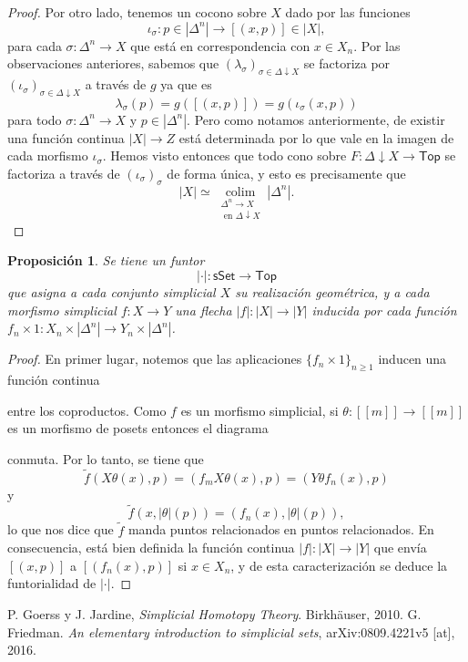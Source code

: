 \documentclass[11pt]{report}
\theoremstyle{colored}
\newtheorem{proposition}{Proposición}[section]
\newcommand{\nat}[1]{[\![#1]\!]}
\newcommand{\ord}[1]{\nat{#1}}
\newcommand{\cat}[1]{\mathsf{#1}}
\renewcommand{\ss}[1]{\Delta^{#1}}
\newcommand{\catcolim}[2]{\underset{#1}{\operatorname{colim}}#2}
\begin{document}
\begin{proof}
Por otro lado, tenemos un cocono sobre $X$ dado por las funciones
\[
\iota_\sigma : p \in |\ss{n}| \to [(x,p)] \in |X|,
\]
para cada $\sigma : \ss{n} \to X$ que está en correspondencia con $x \in X_n$. Por las observaciones anteriores, sabemos que $(\lambda_\sigma)_{\sigma \in \Delta \downarrow X}$ se factoriza por $(\iota_\sigma)_{\sigma \in \Delta \downarrow X}$ a través de $g$ ya que es
\[
\lambda_\sigma(p) = g([(x,p)]) = g(\iota_\sigma(x,p))
\]
para todo $\sigma : \ss{n} \to X$ y $p \in |\ss{n}|$. Pero como notamos anteriormente, de existir una función continua $|X| \to Z$ está determinada por lo que vale en la imagen de cada morfismo $\iota_\sigma$. 
Hemos visto entonces que todo cono sobre $F : \Delta \downarrow X \to \mathsf{Top}$ se factoriza a través de $(\iota_\sigma)_\sigma$ de forma única, y esto es precisamente que
\[
|X| \simeq \catcolim{\substack{\ss{n} \to X \\ \text{ en $\Delta \downarrow X$}}}{|\ss{n}|}.
\]
\end{proof}

\begin{proposition} Se tiene un funtor
\[
| \cdot | : \cat{sSet} \to \cat{Top}
\]
que asigna a cada conjunto simplicial $X$ su realización geométrica, y a cada morfismo simplicial $f : X \to Y$ una flecha $|f| : |X| \to |Y|$ inducida por cada función $f_n \times 1 : X_n \times |\ss{n}| \to Y_n \times |\ss{n}|$.
\end{proposition}
\begin{proof} En primer lugar, notemos que las aplicaciones $\{f_n \times 1\}_{n \geq 1}$ inducen una función continua
\begin{center}
\end{center}

entre los coproductos. Como $f$ es un morfismo simplicial, si $\theta : \ord{m} \to \ord{m}$ es un morfismo de posets entonces el diagrama
\begin{center}
\end{center}
conmuta. Por lo tanto, se tiene que
\[
\widetilde{f}(X\theta(x),p) = (f_mX\theta(x),p) = (Y\theta f_n(x),p)
\]
y
\[
\widetilde{f}(x,|\theta|(p)) = (f_n(x),|\theta|(p)),
\]
lo que nos dice que $\widetilde{f}$ manda puntos relacionados en puntos relacionados. En consecuencia, está bien definida la función continua $|f| : |X| \to |Y|$ que envía $[(x,p)]$ a $[(f_n(x),p)]$ si $x \in X_n$, y de esta caracterización se deduce la funtorialidad de $|\cdot|$.
\end{proof}

\begin{thebibliography}{}
 P. Goerss y J. Jardine, \textit{Simplicial Homotopy Theory}. Birkhäuser, 2010.
 G. Friedman. \textit{An elementary introduction to simplicial sets}, arXiv:0809.4221v5 [at], 2016.
\end{thebibliography}
\end{document}
